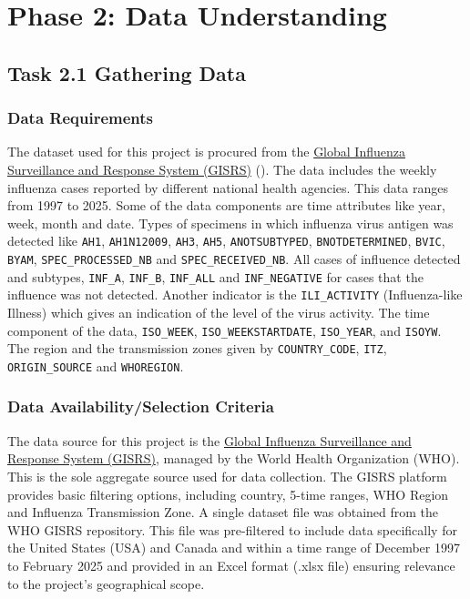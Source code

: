 \section*{Phase 2: Data Understanding}

\subsection*{Task 2.1 Gathering Data}

\subsubsection*{Data Requirements}

The dataset used for this project is procured from the \href{https://app.powerbi.com/view?r=eyJrIjoiNjViM2Y4NjktMjJmMC00Y2NjLWFmOWQtODQ0NjZkNWM1YzNmIiwidCI6ImY2MTBjMGI3LWJkMjQtNGIzOS04MTBiLTNkYzI4MGFmYjU5MCIsImMiOjh9}{Global Influenza Surveillance and Response System (GISRS)} (\textcite{who_flunet}). The data includes the weekly influenza cases reported by different national health agencies. This data ranges from 1997 to 2025. Some of the data components are time attributes like year, week, month and date. Types of specimens in which influenza virus antigen was detected like \texttt{AH1}, \texttt{AH1N12009}, \texttt{AH3}, \texttt{AH5}, \texttt{ANOTSUBTYPED}, \texttt{BNOTDETERMINED}, \texttt{BVIC}, \texttt{BYAM}, \texttt{SPEC\_PROCESSED\_NB} and \texttt{SPEC\_RECEIVED\_NB}. All cases of influence detected and subtypes, \texttt{INF\_A}, \texttt{INF\_B}, \texttt{INF\_ALL} and \texttt{INF\_NEGATIVE} for cases that the influence was not detected. Another indicator is the \texttt{ILI\_ACTIVITY} (Influenza-like Illness) which gives an indication of the level of the virus activity. The time component of the data, \texttt{ISO\_WEEK}, \texttt{ISO\_WEEKSTARTDATE}, \texttt{ISO\_YEAR}, and \texttt{ISOYW}. The region and the transmission zones given by \texttt{COUNTRY\_CODE}, \texttt{ITZ}, \texttt{ORIGIN\_SOURCE} and \texttt{WHOREGION}.

\subsubsection*{Data Availability/Selection Criteria}

The data source for this project is the \href{https://app.powerbi.com/view?r=eyJrIjoiNjViM2Y4NjktMjJmMC00Y2NjLWFmOWQtODQ0NjZkNWM1YzNmIiwidCI6ImY2MTBjMGI3LWJkMjQtNGIzOS04MTBiLTNkYzI4MGFmYjU5MCIsImMiOjh9}{Global Influenza Surveillance and Response System (GISRS)}, managed by the World Health Organization (WHO). This is the sole aggregate source used for data collection. The GISRS platform provides basic filtering options, including country, 5-time ranges, WHO Region and Influenza Transmission Zone. A single dataset file was obtained from the WHO GISRS repository. This file was pre-filtered to include data specifically for the United States (USA) and Canada and within a time range of December 1997 to February 2025 and provided in an Excel format (.xlsx file) ensuring relevance to the project's geographical scope.

